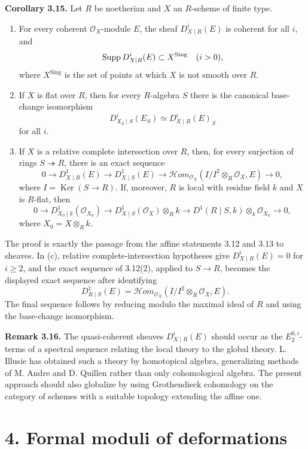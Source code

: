 \documentclass[11pt]{article}
\providecommand{\Ker}{\operatorname{Ker}}
\begin{document}
\textbf{Corollary 3.15.} Let \(R\) be noetherian and \(X\) an \(R\)-scheme of finite type.
\begin{enumerate}[label=(\alph*)]
\item For every coherent \(\mathcal O_X\)-module \(E\), the sheaf \(D^i_{X\mid R}(E)\) is coherent for all \(i\), and
\[
 \operatorname{Supp} D^i_{X\mid R}(E)\subset X^{\mathrm{Sing}}
 \quad (i>0),
\]
where \(X^{\mathrm{Sing}}\) is the set of points at which \(X\) is not smooth over \(R\).
\item If \(X\) is flat over \(R\), then for every \(R\)-algebra \(S\) there is the canonical base-change isomorphism
\[
 D^i_{X_S\mid S}(E_S)\simeq D^i_{X\mid R}(E)_S
\]
for all \(i\).
\item If \(X\) is a relative complete intersection over \(R\), then, for every surjection of rings \(S\twoheadrightarrow R\), there is an exact sequence
\[
 0\to D^1_{X\mid R}(E)\to D^1_{X\mid S}(E)
 \to \mathcal Hom_{\mathcal O_X}(I/I^2\otimes_R\mathcal O_X,E)\to 0,
\]
where \(I=\Ker(S\to R)\). If, moreover, \(R\) is local with residue field \(k\) and \(X\) is \(R\)-flat, then
\[
 0\to D^1_{X_0\mid k}(\mathcal O_{X_0})\to
 D^1_{X\mid S}(\mathcal O_X)\otimes_R k
 \to D^1(R\mid S,k)\otimes_k\mathcal O_{X_0}\to 0,
\]
where \(X_0=X\otimes_R k\).
\end{enumerate}
The proof is exactly the passage from the affine statements 3.12 and 3.13 to sheaves. In (c), relative complete-intersection hypotheses give \(D^i_{X\mid R}(E)=0\) for \(i\geq 2\), and the exact sequence of 3.12(2), applied to \(S\to R\), becomes the displayed exact sequence after identifying
\[
 D^1_{R\mid S}(E)=\mathcal Hom_{\mathcal O_X}(I/I^2\otimes_R\mathcal O_X,E).
\]
The final sequence follows by reducing modulo the maximal ideal of \(R\) and using the base-change isomorphism.

\textbf{Remark 3.16.} The quasi-coherent sheaves \(D^i_{X\mid R}(E)\) should occur as the \(E^{0,i}_2\)-terms of a spectral sequence relating the local theory to the global theory. L. Illusie has obtained such a theory by homotopical algebra, generalizing methods of M. Andre and D. Quillen rather than only cohomological algebra. The present approach should also globalize by using Grothendieck cohomology on the category of schemes with a suitable topology extending the affine one.

\section*{4. Formal moduli of deformations}
\end{document}
